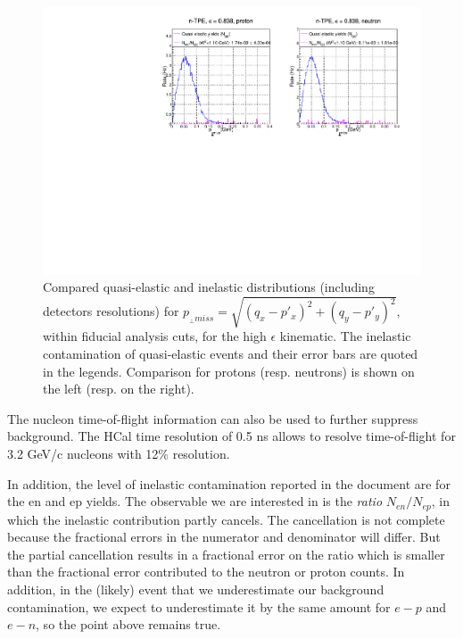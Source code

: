 \documentclass[11pt]{article}
\begin{document}
\begin{figure}[!h]
  \centering
    \includegraphics[width=12cm]{gen-tpe_he_pperp_acc_real_new.pdf}
    \caption{Compared quasi-elastic and inelastic distributions (including detectors resolutions) for $p_{_{\perp} miss} = \sqrt{(q_{x}-p'_{x})^2+(q_{y}-p'_{y})^2}$, within fiducial analysis cuts, for the high $\epsilon$ kinematic. The inelastic contamination of quasi-elastic events and their error bars are quoted in the legends. Comparison for protons (resp. neutrons) is shown on the left (resp. on the right).}%
    \label{fig:inel_contam_he}
\end{figure}
%
\fi
The nucleon time-of-flight information can also be used to further suppress background. The HCal time resolution of 0.5 ns allows to resolve time-of-flight for 3.2 GeV/c nucleons with 12\% resolution.

In addition, the level of inelastic contamination reported in the document are for the en and ep yields.
The observable we are interested in is the {\it ratio} $N_{en}/N_{ep}$, in which the inelastic contribution partly cancels.
The cancellation is not complete because the fractional errors in the numerator and 
denominator will differ.
But the partial cancellation results in a fractional error on the ratio which is smaller than the fractional error contributed to the neutron or proton counts.
In addition, in the (likely) event that we underestimate our background contamination,
we expect to underestimate it by the same amount for $e-p$ and $e-n$, so the point above remains true.\\
\end{document}
